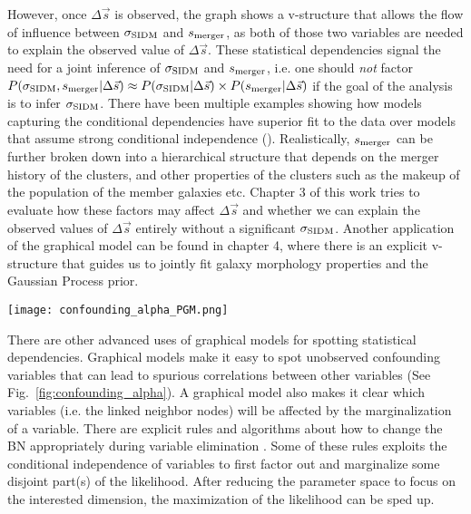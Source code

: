 However, once $\Delta \vec{s}$ is observed, the graph shows a v-structure that
allows the flow of influence between $\sigma_{\rm SIDM}$ and $s_{\rm
merger}$, as both of those two variables are needed to explain the observed
value of $\Delta \vec{s}$. These
statistical dependencies signal the need for a joint inference of 
$\sigma_{\rm SIDM}$ and $s_{\rm merger}$, i.e. one should {\it not} factor
$P(\sigma_{\rm SIDM}, s_{\rm merger} | \Delta
\vec{s}) \approx
P(\sigma_{\rm SIDM} |\Delta \vec{s} ) \times P(s_{\rm merger} |\Delta \vec{s})$
if the goal of the analysis is to infer $\sigma_{\rm SIDM}$.
There have been multiple examples showing how models capturing the conditional 
dependencies have superior fit to the data over models that assume
strong conditional independence (\citealt{Koller2009}). 
Realistically, $s_{\rm merger}$ can be further broken down into a
hierarchical structure that depends on the merger history of the clusters, 
and other properties of the clusters such as the makeup of the population of 
the member galaxies etc. 
Chapter 3 of this work tries to evaluate how these factors may affect $\Delta
\vec{s}$ and whether we can explain the observed values of $\Delta \vec{s}$ 
entirely without a significant $\sigma_{\rm SIDM}$. 
Another application of the graphical model can be
found in chapter 4, where there is an explicit v-structure that guides us to
jointly fit galaxy morphology properties and the Gaussian Process prior.

\begin{figure*}[h]
	\begin{center}
	\texttt{[image: confounding\_alpha\_PGM.png]}
	\caption{
		Another toy example pertinent to the content in chapter 2. The abbreviated PGM
		shows how the projection angle of the merger axis of
		a galaxy cluster ($\alpha$)	can be an
		unobserved confounding variable that introduces additional correlation between 
		the time-since-pericenter (TSP) and  
		$\Delta \vec{s}$. Since we used a probabilistic
		Monte Carlo approach, the confounding effect is accounted for in Chapter 2.
		\label{fig:confounding_alpha}
	}
	\end{center}
\end{figure*}
There are other advanced uses of graphical models for spotting statistical
dependencies. Graphical models make it easy to spot unobserved confounding
variables that can lead to spurious correlations between other variables (See
Fig.~\ref{fig:confounding_alpha}). A graphical model also makes it clear which 
variables (i.e. the linked neighbor 
nodes) will be affected by the marginalization of a variable. 
There are explicit rules and algorithms about how to change the BN appropriately 
during variable elimination \citep{Murphy2012}. Some of these rules exploits 
the conditional independence of variables to first factor out and marginalize
some disjoint part(s) of the likelihood. After reducing the parameter space to focus
on the interested dimension, the maximization of the likelihood can be sped up.   
  
